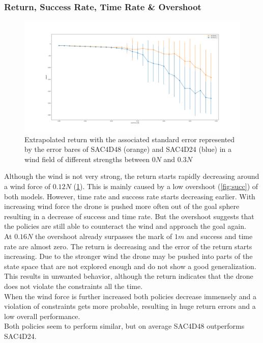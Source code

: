 \subsubsection*{Return, Success Rate, Time Rate \& Overshoot}
\begin{figure} 
	\centering
	\includegraphics[width=\linewidth]{figures/windreward.png}
	\caption{Extrapolated return with the associated standard error represented by the error bares 
	of SAC4D48 (orange) and SAC4D24 (blue) in a wind field of different strengths between $0N$ and $0.3N$}
	\label{fig:return}
\end{figure}
Although the wind is not very strong, the return starts rapidly decreasing around a wind force of $0.12N$ (\cref{fig:return}).
This is mainly caused by a low overshoot (\cref{fig:succ}) of both models.
However, time rate and success rate starts decreasing earlier. With increasing wind force 
the drone is pushed more often out of the goal sphere resulting in a decrease of success and time rate.
But the overshoot suggests that the policies are still able to counteract the wind and approach the 
goal again.\\
At $0.16N$ the overshoot already surpasses the mark of $1m$ and success and time rate are almost zero.
The return is decreasing and the error of the return starts increasing. Due to the stronger wind
the drone may be pushed into parts of the state space that are not explored enough
and do not show a good generalization. This results in unwanted behavior, although the 
return indicates that the drone does not violate the constraints all the time.\\
When the wind force is further increased both policies decrease immensely and a violation of 
constraints gets more probable, resulting in huge return errors and a low overall performance.\\
Both policies seem to perform similar, but on average SAC4D48 outperforms SAC4D24.

